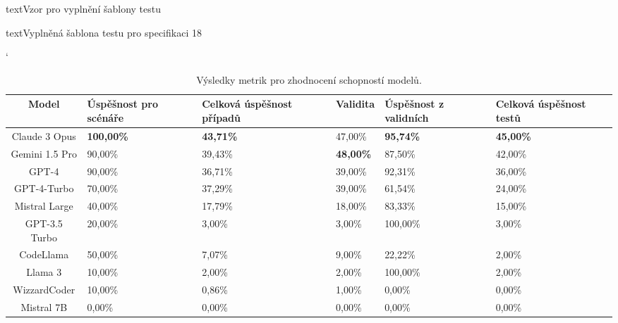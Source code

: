 \documentclass[czech, ma, kiv, he, iso690numb, pdf, viewonly]{fasthesis}
\begin{document}
\begin{code}{text}{Vzor pro vyplnění šablony testu \label{lst:template}}
{\begin{code}{text}{Vyplněná šablona testu pro specifikaci 18 \label{lst:spec18}}
{        \begin{table}[H]
            \catcode`
            \begin{tabular}{|c|p{2cm}|p{2cm}|l|p{2cm}|p{2cm}|}
                \hline
                \textbf{Model} & \textbf{Úspěšnost pro \linebreak scénáře} & \textbf{Celková úspěšnost případů} & \textbf{Validita} & \textbf{Úspěšnost z validních} & \textbf{Celková úspěšnost testů} \\
                \hline
                \hline
                Claude 3 Opus & \textbf{100,00\%} & \textbf{43,71\%} & 47,00\% & \textbf{95,74\%} & \textbf{45,00\%} \\
                \hline
                Gemini 1.5 Pro & 90,00\% & 39,43\% & \textbf{48,00\%} & 87,50\% & 42,00\% \\
                \hline
                GPT-4         & 90,00\%  & 36,71\% & 39,00\% & 92,31\% & 36,00\% \\
                \hline
                GPT-4-Turbo   & 70,00\%  & 37,29\% & 39,00\% & 61,54\% & 24,00\% \\
                \hline
                Mistral Large & 40,00\%  & 17,79\% & 18,00\% & 83,33\% & 15,00\% \\
                \hline
                GPT-3.5 Turbo & 20,00\%  & 3,00\%  & 3,00\%  & 100,00\% & 3,00\% \\
                \hline
                CodeLlama     & 50,00\%  & 7,07\%  & 9,00\%  & 22,22\% & 2,00\% \\
                \hline
                Llama 3       & 10,00\%  & 2,00\%  & 2,00\%  & 100,00\% & 2,00\% \\
                \hline
                WizzardCoder  & 10,00\%  & 0,86\%  & 1,00\%  & 0,00\%  & 0,00\% \\
                \hline
                Mistral 7B    & 0,00\%   & 0,00\%  & 0,00\%  & 0,00\%  & 0,00\% \\
                \hline
            \end{tabular}
            \centering
            \caption{Výsledky metrik pro zhodnocení schopností modelů.}
            \label{tab:model_metrics}
        \end{table}

}
\end{code}}
\end{code}
\end{document}
